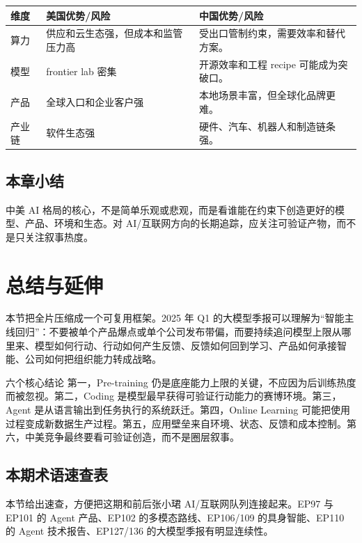 \documentclass[a4paper]{article}
\begin{document}
\noindent\begin{tabularx}{\textwidth}{p{}p{}X}
\toprule
维度 & 美国优势/风险 & 中国优势/风险 \\
\midrule
算力 & 供应和云生态强，但成本和监管压力高 & 受出口管制约束，需要效率和替代方案。 \\
模型 & frontier lab 密集 & 开源效率和工程 recipe 可能成为突破口。 \\
产品 & 全球入口和企业客户强 & 本地场景丰富，但全球化品牌更难。 \\
产业链 & 软件生态强 & 硬件、汽车、机器人和制造链条强。 \\
\bottomrule
\end{tabularx}

\subsection{本章小结}

中美 AI 格局的核心，不是简单乐观或悲观，而是看谁能在约束下创造更好的模型、产品、环境和生态。对 AI/互联网方向的长期追踪，应关注可验证产物，而不是只关注叙事热度。

\section{总结与延伸}

本节把全片压缩成一个可复用框架。2025 年 Q1 的大模型季报可以理解为“智能主线回归”：不要被单个产品爆点或单个公司发布带偏，而要持续追问模型上限从哪里来、模型如何行动、行动如何产生反馈、反馈如何回到学习、产品如何承接智能、公司如何把组织能力转成战略。

\begin{importantbox}{六个核心结论}
第一，Pre-training 仍是底座能力上限的关键，不应因为后训练热度而被忽视。第二，Coding 是模型最早获得可验证行动能力的赛博环境。第三，Agent 是从语言输出到任务执行的系统跃迁。第四，Online Learning 可能把使用过程变成新数据生产过程。第五，应用壁垒来自环境、状态、反馈和成本控制。第六，中美竞争最终要看可验证创造，而不是圈层叙事。
\end{importantbox}

\subsection{本期术语速查表}

本节给出速查，方便把这期和前后张小珺 AI/互联网队列连接起来。EP97 与 EP101 的 Agent 产品、EP102 的多模态路线、EP106/109 的具身智能、EP110 的 Agent 技术报告、EP127/136 的大模型季报有明显连续性。
\end{document}
